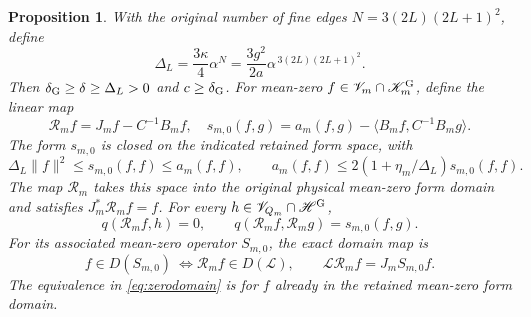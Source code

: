 \documentclass[11pt]{article}
\newtheorem{proposition}[theorem]{Proposition}
\newcommand{\HH}{\mathscr H}
\newcommand{\KK}{\mathscr K}
\newcommand{\LL}{\mathscr L}
\newcommand{\VV}{\mathscr V}
\begin{document}
\begin{proposition}\label{prop:finitezero}
With the original number of fine edges $N=3(2L)(2L+1)^2$, define
\begin{equation}\label{eq:finitegap}
 \Delta_L=\frac{3\kappa}{4}\alpha^N
          =\frac{3g^2}{2a}\alpha^{\,3(2L)(2L+1)^2}.
\end{equation}
Then $\delta_{\rm G}\geq\delta\geq\Delta_L>0$ and $c\geq\delta_{\rm G}$.
For mean-zero $f\in\VV_m\cap\KK_m^{\rm G}$, define the linear map
\begin{equation}\label{eq:Rzero}
 \mathcal R_m f=J_mf-C^{-1}B_mf,\quad
 s_{m,0}(f,g)=a_m(f,g)-\langle B_mf,C^{-1}B_mg\rangle.
\end{equation}
The form $s_{m,0}$ is closed on the indicated retained form space,
with
\begin{equation}\label{eq:zerocoercivity}
 \Delta_L\|f\|^2\leq s_{m,0}(f,f)\leq a_m(f,f),\qquad
 a_m(f,f)\leq2(1+\eta_m/\Delta_L)s_{m,0}(f,f).
\end{equation}
The map $\mathcal R_m$ takes this space into the original physical
mean-zero form domain and satisfies $J_m^*\mathcal R_mf=f$.
For every $h\in\VV_{Q_m}\cap\HH^{\rm G}$,
\begin{equation}\label{eq:zeroorthogonal}
 q(\mathcal R_m f,h)=0,\qquad
 q(\mathcal R_m f,\mathcal R_m g)=s_{m,0}(f,g).
\end{equation}
For its associated mean-zero operator $S_{m,0}$, the exact domain map is
\begin{equation}\label{eq:zerodomain}
 f\in D(S_{m,0})\ \Longleftrightarrow
 \mathcal R_m f\in D(\LL),\qquad
 \LL\mathcal R_m f=J_mS_{m,0}f.
\end{equation}
The equivalence in \eqref{eq:zerodomain} is for $f$ already in the
retained mean-zero form domain.
\end{proposition}
\end{document}
